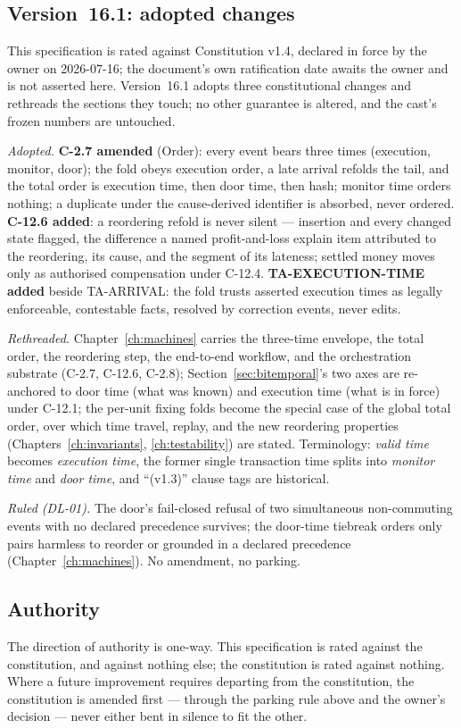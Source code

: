 \documentclass[11pt,a4paper]{article}
\begin{document}
\subsection{Version~16.1: adopted changes}

This specification is rated against Constitution v1.4, declared in force by the owner on
2026-07-16; the document's own ratification date awaits the owner and is not asserted here.
Version~16.1 adopts three constitutional changes and rethreads the sections they touch; no other
guarantee is altered, and the cast's frozen numbers are untouched.

\emph{Adopted.} \textbf{C-2.7 amended} (Order): every event bears three times (execution,
monitor, door); the fold obeys execution order, a late arrival refolds the tail, and the total
order is execution time, then door time, then hash; monitor time orders nothing; a duplicate
under the cause-derived identifier is absorbed, never ordered. \textbf{C-12.6 added}: a reordering
refold is never silent --- insertion and every changed state flagged, the difference a named
profit-and-loss explain item attributed to the reordering, its cause, and the segment of its
lateness; settled money moves only as authorised compensation under C-12.4.
\textbf{TA-EXECUTION-TIME added} beside TA-ARRIVAL: the fold trusts asserted execution times as
legally enforceable, contestable facts, resolved by correction events, never edits.

\emph{Rethreaded.} Chapter~\ref{ch:machines} carries the three-time envelope, the total order,
the reordering step, the end-to-end workflow, and the orchestration substrate (C-2.7, C-12.6,
C-2.8); Section~\ref{sec:bitemporal}'s two axes are re-anchored to door time (what was known) and
execution time (what is in force) under C-12.1; the per-unit fixing folds become the special case
of the global total order, over which time travel, replay, and the new reordering properties
(Chapters~\ref{ch:invariants}, \ref{ch:testability}) are stated. Terminology: \emph{valid time}
becomes \emph{execution time}, the former single transaction time splits into \emph{monitor time}
and \emph{door time}, and ``(v1.3)'' clause tags are historical.

\emph{Ruled (DL-01).} The door's fail-closed refusal of two simultaneous non-commuting events
with no declared precedence survives; the door-time tiebreak orders only pairs harmless to
reorder or grounded in a declared precedence (Chapter~\ref{ch:machines}). No amendment, no parking.

\subsection{Authority}

The direction of authority is one-way. This specification is rated against the
constitution, and against nothing else; the constitution is rated against nothing. Where a
future improvement requires departing from the constitution, the constitution is amended
first --- through the parking rule above and the owner's decision --- never either bent in
silence to fit the other.
\end{document}
